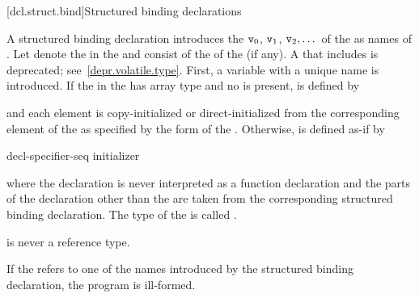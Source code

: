 \documentclass{wg21}
\begin{document}
[dcl.struct.bind]{Structured binding declarations}%

\pnum
A structured binding declaration introduces the 
$\texttt{v}_0$, $\texttt{v}_1$, $\texttt{v}_2, \dotsc$
of the
 as names
of .
Let \cv{} denote the  in
the  and
 consist of the  of
the  (if any).
A \cv{} that includes  is deprecated;
see~\ref{depr.volatile.type}. %
First, a variable with a unique name  is introduced. If the
 in the 
has array type   and no  is present,
 is defined by
\begin{ncbnf}
      \cv{}   \terminal{;}
\end{ncbnf}
and each element is copy-initialized or direct-initialized
from the corresponding element of the  as specified
by the form of the .
Otherwise, 
is defined as-if by
\begin{ncbnf}
     decl-specifier-seq   initializer \terminal{;}
\end{ncbnf}
where
the declaration is never interpreted as a function declaration and
the parts of the declaration other than the  are taken
from the corresponding structured binding declaration.
The type of the 
 is called .
\begin{note}
     is never a reference type.
\end{note}

\pnum
If the  refers to
one of the names introduced by the structured binding declaration,
the program is ill-formed.
\end{document}
